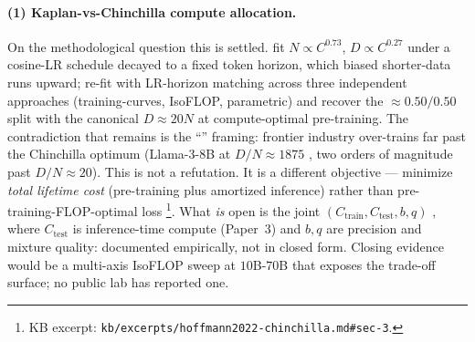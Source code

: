 \paragraph{(1) Kaplan-vs-Chinchilla compute allocation.}
On the methodological question this is settled.
\citet[\S 6]{kaplan2020} fit $N \propto C^{0.73}$, $D \propto C^{0.27}$
under a cosine-LR schedule decayed to a fixed token horizon, which
biased shorter-data runs upward;
\citet[\S 3, Table 2]{hoffmann2022-chinchilla} re-fit with
LR-horizon matching across three independent approaches
(training-curves, IsoFLOP, parametric) and recover the
$\approx 0.50/0.50$ split with the canonical $D \approx 20 N$ at
compute-optimal pre-training. The contradiction that remains is the
``'' framing: frontier industry over-trains far past
the Chinchilla optimum (Llama-3-8B at $D / N \approx 1875$
\citep{meta-llama3}, two orders of magnitude past
$D / N \approx 20$). This is not a refutation. It is a different
objective --- minimize \emph{total lifetime cost} (pre-training plus
amortized inference) rather than pre-training-FLOP-optimal loss
\citep[\S \ref{sec:scaling-map}]{hoffmann2022-chinchilla}\protect\footnote{KB
excerpt: \texttt{kb/excerpts/hoffmann2022-chinchilla.md\#sec-3}.}. What
\emph{is} open is the joint
$(C_{\text{train}}, C_{\text{test}}, b, q)$ , where
$C_{\text{test}}$ is inference-time compute (Paper~3) and $b, q$ are
precision and mixture quality: documented empirically, not in closed
form. Closing evidence would be a multi-axis IsoFLOP sweep at
$10$B-$70$B that exposes the trade-off surface; no public lab has
reported one.

